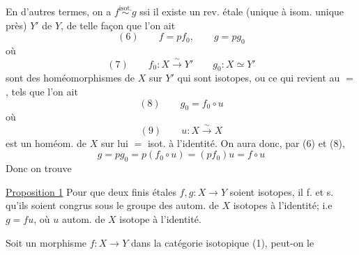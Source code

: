 En d'autres termes, on a $f\overset{\mathrm{isot.}}{\sim}g$ ssi il existe un rev.  étale (unique à isom. unique près) $Y'$ de $Y$, de telle façon que l'on ait
\[
(6)\qquad f=pf_0,\qquad g=pg_0
\]
où
\[
(7)\qquad f_0:X\xrightarrow{\sim}Y'\qquad g_0:X\simeq Y'
\]
sont des homéomorphismes de $X$ sur $Y'$ qui sont isotopes, ou ce qui revient au $=$, tels que l'on ait
\[
(8)\qquad g_0=f_0\circ u
\]
où
\[
(9)\qquad u:X\xrightarrow{\sim}X
\]
 est un homéom. de $X$ sur lui $=$ isot. à l'identité. On aura donc, par (6) et (8),
\[
g=pg_0=p(f_0\circ u)=(pf_0)u=f\circ u
\]
Donc on trouve

\uline{Proposition 1} Pour que deux   finis étales $f,g:X\longrightarrow Y$ soient isotopes, il f. et s. qu'ils soient congrus sous le groupe des autom. de $X$ isotopes à l'identité; i.e $g=fu$, où $u$ autom. de $X$ isotope à l'identité.

Soit un  morphisme $f:X\longrightarrow Y$ dans la catégorie isotopique (1), peut-on le
